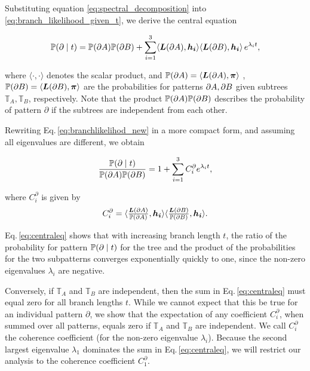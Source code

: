 \medskip 

Substituting equation \eqref{eq:spectral_decomposition} into \eqref{eq:branch_likelihood_given_t}, we derive the central equation

\begin{align}\label{eq:branchlikelihod_new}
    \mathbb{P}(\partial \mid t)  = \mathbb{P}({\partial A})\mathbb{P}({\partial B}) +  \sum_{i =1}^3  \langle { \bm{L}(\partial A) },\bm{h_i}\rangle \langle { \bm{L}(\partial B) }, \bm{h_i}\rangle\, e^{\lambda_i t},
\end{align}

where $\langle\cdot,\cdot\rangle$ denotes the scalar product, and $\mathbb{P}({\partial A}) = \langle { \bm{L}(\partial A) },\bm{\pi}\rangle$ , $\mathbb{P}({\partial B}) = \langle { \bm{L}(\partial B) },\bm{\pi}\rangle$ are the probabilities for patterns ${\partial A}, {\partial B}$ given subtrees $\mathbb{T}_A, \mathbb{T}_B$, respectively. Note that the product $\mathbb{P}({\partial A})\mathbb{P}({\partial B})$ describes the probability of pattern $\partial$ if the subtrees are independent from each other.

\medskip

Rewriting Eq.\,\eqref{eq:branchlikelihod_new} in a more compact form, and assuming all eigenvalues are different, we obtain

\begin{align} \label{eq:centraleq} 
\frac{\mathbb{P}(\partial \mid t)}{\mathbb{P}({\partial A})\mathbb{P}({\partial B})} =  1 + \sum_{i =1}^3 C^\partial_i  e^{\lambda_i t},
\end{align}

where  $C^\partial_i$ is given by
\begin{equation}
    C^\partial_i = \langle  \tfrac{{ \bm{L}(\partial A) }}{\mathbb{P}({\partial A})},\bm{h_i}\rangle \langle \tfrac{{ \bm{L}(\partial B) }}{\mathbb{P}({\partial B})}, \bm{h_i}\rangle.
\end{equation}

\medskip


Eq.\,\eqref{eq:centraleq} shows that with increasing branch length $t$, the ratio of the probability for pattern
$\mathbb{P}(\partial \mid t)$ for the tree and the product of the probabilities for the two subpatterns converges
exponentially quickly to one, since the non-zero eigenvalues $\lambda_i$ are negative.

\medskip 

Conversely, if $\mathbb{T}_A$ and $ \mathbb{T}_B$ are independent, then the sum in Eq.\,\eqref{eq:centraleq} must equal zero for all branch lengths $t$. While we cannot expect that this be true for an individual pattern $\partial$, we show that the expectation of any coefficient $C^\partial_i$, when summed over all patterns, equals zero if $\mathbb{T}_A$ and $\mathbb{T}_B$ are independent. We call $C^\partial_i$ the coherence coefficient (for the non-zero eigenvalue $\lambda_i$). Because the second largest eigenvalue $\lambda_1$ dominates the sum in Eq.\,\eqref{eq:centraleq}, we will restrict our analysis to the coherence coefficient $C^\partial_1$.

